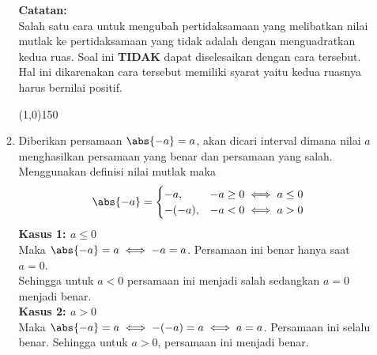 \begin{enumerate}[leftmargin=*, label={\arabic*}.]
\begin{enumerate}[label={\alph*}.]
\vspace{0.1cm}
\textbf{Catatan:}\\
Salah satu cara untuk mengubah pertidaksamaan yang melibatkan nilai mutlak ke 
pertidaksamaan yang tidak adalah dengan menguadratkan kedua ruas. Soal ini \textbf{TIDAK} 
dapat diselesaikan dengan cara tersebut. Hal ini dikarenakan cara tersebut memiliki syarat 
yaitu kedua ruasnya harus bernilai positif.
\begin{center}
    \line(1,0){150}
\end{center}
\item Diberikan persamaan $\abs{-a} = a$, akan dicari interval dimana nilai $a$ menghasilkan
persamaan yang benar dan persamaan yang salah.\\
Menggunakan definisi nilai mutlak maka
\[
    \abs{-a} = 
    \begin{cases}
        -a, &-a \geq 0 \iff a \leq 0\\
        -(-a), &-a < 0 \iff a > 0
    \end{cases}
\]
\textbf{Kasus 1: $a \leq 0$}\\
Maka $\abs{-a} = a \iff -a = a$. Persamaan ini benar hanya saat $a = 0$.\\
Sehingga untuk $a < 0$ persamaan ini menjadi salah sedangkan $a = 0$ menjadi benar.\\
\textbf{Kasus 2: $a > 0$}\\
Maka $\abs{-a} = a \iff -(-a) = a \iff a = a$. Persamaan ini 
selalu benar. Sehingga untuk $a > 0$, persamaan ini menjadi benar.


\end{enumerate}
\end{enumerate}
